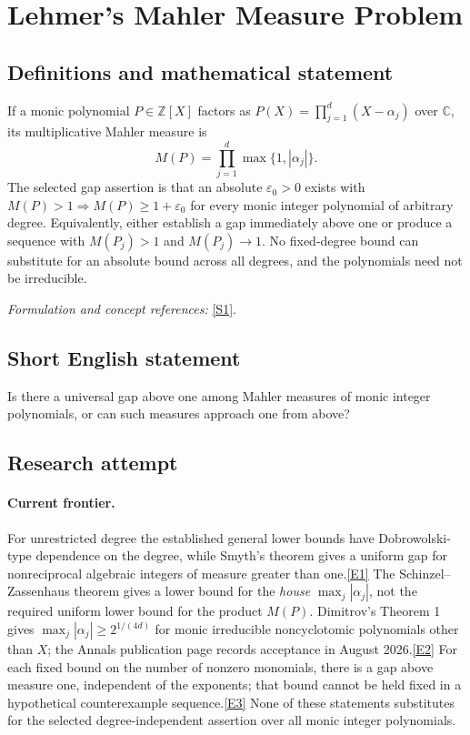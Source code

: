 \documentclass[11pt,a4paper]{article}
\newcommand{\Z}{\mathbb{Z}}
\newcommand{\C}{\mathbb{C}}
\newcommand{\eps}{\varepsilon}
\newcommand{\sref}[2]{\hyperlink{source:#1:#2}{[S#2]}}
\newcommand{\eref}[2]{\hyperlink{extra:#1:#2}{[E#2]}}
\newif\ifshowcatalogue
\newcommand{\cataloguescope}[1]{\ifshowcatalogue
 \paragraph{Exact scope in the supplied catalogue.}
 \begin{quote}\small #1\end{quote}\fi}
\begin{document}
\setcounter{section}{0}
\clearpage
\section*{\texorpdfstring{Lehmer’s Mahler Measure Problem}{Lehmer’s Mahler Measure Problem}}\label{statement}
\subsection{Definitions and mathematical statement}
If a monic polynomial $P\in\Z[X]$ factors as
$P(X)=\prod_{j=1}^d(X-\alpha_j)$ over $\C$, its multiplicative Mahler measure is
\[
 M(P)=\prod_{j=1}^d\max\{1,|\alpha_j|\}.
\]
The selected gap assertion is that an absolute $\eps_0>0$ exists with
$M(P)>1\Longrightarrow M(P)\ge1+\eps_0$ for every monic integer polynomial of arbitrary degree. Equivalently, either establish a gap immediately above one or produce a sequence with $M(P_j)>1$ and $M(P_j)\to1$. No fixed-degree bound can substitute for an absolute bound across all degrees, and the polynomials need not be irreducible.
\par\smallskip\textit{Formulation and concept references:} \sref{statement}{1}.
\cataloguescope{Prove that there exists an absolute epsilon > 0 such that every monic integer polynomial P with Mahler measure M(P) > 1 satisfies M(P) >= 1 + epsilon, or construct a sequence of such polynomials whose Mahler measures decrease to 1.}
\subsection{Short English statement}
Is there a universal gap above one among Mahler measures of monic integer polynomials, or can such measures approach one from above?
\subsection{Research attempt}

\paragraph{Current frontier.}
For unrestricted degree the established general lower bounds have
Dobrowolski-type dependence on the degree, while Smyth's theorem gives
a uniform gap for nonreciprocal algebraic integers of measure greater than one.\eref{statement}{1}
The Schinzel--Zassenhaus theorem gives a lower bound for the \emph{house}
$\max_j|\alpha_j|$, not the required uniform lower bound for the product
$M(P)$. Dimitrov's Theorem 1 gives $\max_j|\alpha_j|\ge2^{1/(4d)}$
for monic irreducible noncyclotomic polynomials other than $X$;
the Annals publication page records acceptance in August 2026.\eref{statement}{2}
For each fixed bound on the number of nonzero monomials, there is a gap
above measure one, independent of the exponents; that bound cannot be
held fixed in a hypothetical counterexample sequence.\eref{statement}{3}
None of these statements substitutes for the selected degree-independent
assertion over all monic integer polynomials.
\end{document}
